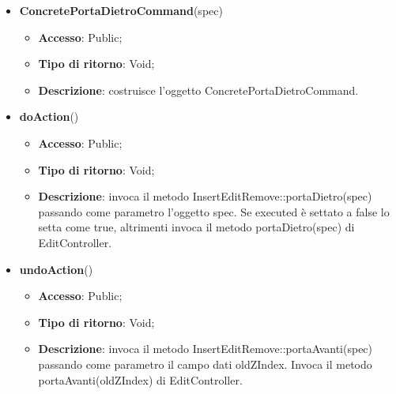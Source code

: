 {{{		
		\begin{itemize}
			\item \textbf{ConcretePortaDietroCommand}(spec)
			\begin{itemize}
				\item \textbf{Accesso}: Public;
				\item \textbf{Tipo di ritorno}: Void;
				\item \textbf{Descrizione}: costruisce l’oggetto ConcretePortaDietroCommand.
			\end{itemize}
			\item \textbf{doAction}()
			\begin{itemize}
				\item \textbf{Accesso}: Public;
				\item \textbf{Tipo di ritorno}: Void;
				\item \textbf{Descrizione}: invoca il metodo InsertEditRemove::portaDietro(spec) passando come parametro l'oggetto spec. Se executed è settato a false lo setta come true, altrimenti invoca il metodo portaDietro(spec) di EditController.
			\end{itemize}
			\item \textbf{undoAction}()
			\begin{itemize}
				\item \textbf{Accesso}: Public;
				\item \textbf{Tipo di ritorno}: Void;
				\item \textbf{Descrizione}: invoca il metodo InsertEditRemove::portaAvanti(spec) passando come parametro il campo dati oldZIndex. Invoca il metodo portaAvanti(oldZIndex) di EditController.
			\end{itemize}
		\end{itemize}
}

}}

